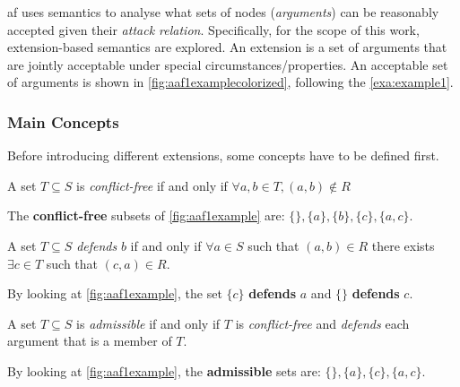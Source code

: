         \gls{af} uses semantics to analyse what sets of nodes (\textit{arguments}) can be reasonably accepted given their \textit{attack relation}. Specifically, for the scope of this work, extension-based semantics are explored. An extension is a set of arguments that are jointly acceptable under special circumstances/properties. An acceptable set of arguments is shown in \autoref{fig:aaf1examplecolorized}, following the \cref{exa:example1}.
        
        
        \subsubsection{Main Concepts}
            Before introducing different extensions, some concepts have to be defined first.
            \begin{definition}
                A set $T \subseteq S$ is \textit{conflict-free} if and only if $ \forall a, b \in T, (a, b) \notin R$
                \label{definition:definition2}
            \end{definition}
            \begin{exa}
                The \textbf{conflict-free} subsets of \autoref{fig:aaf1example} are: $\{\}, \{a\}, \{b\}, \{c\}, \{a, c\}$.
                \label{exa:example2}
            \end{exa}
            
            \begin{definition}
                A set $T \subseteq S$ \textit{defends} $b$ if and only if $ \forall a \in S$ such that $(a, b) \in R$ there exists $\exists c \in T$ such that $(c, a) \in R$.
                \label{definition:definition3}
            \end{definition}
            \begin{exa}
                By looking at \autoref{fig:aaf1example}, the set $\{c\}$ \textbf{defends} $a$ and $\{\}$ \textbf{defends} $c$.
                \label{exa:example3}
            \end{exa}
            
            \begin{definition}
                A set $T \subseteq S$ is \textit{admissible} if and only if $T$ is \textit{conflict-free} and \textit{defends} each argument that is a member of $T$.
                \label{definition:definition4}
            \end{definition}
            \begin{exa}
                By looking at \autoref{fig:aaf1example}, the \textbf{admissible} sets are:  $\{\}, \{a\}, \{c\}, \{a, c\}$.
                \label{exa:example4}
            \end{exa}
            
